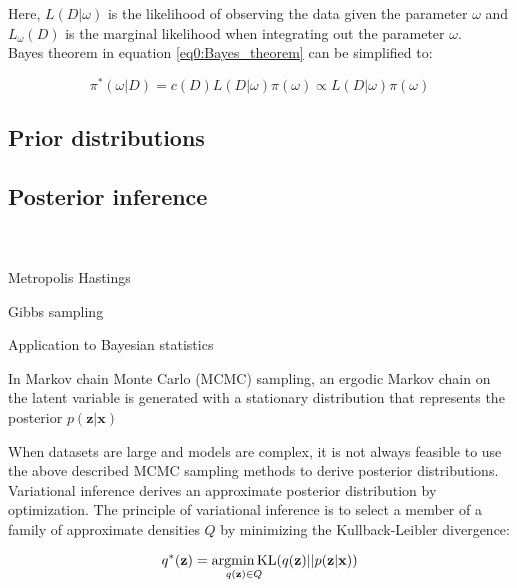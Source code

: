 Here, $L(D|\omega)$ is the likelihood of observing the data given the parameter $\omega$ and $L_\omega(D)$ is the marginal likelihood when integrating out the parameter $\omega$.\\

Bayes theorem in equation \ref{eq0:Bayes_theorem} can be simplified to:

\begin{equation}
\pi^*(\omega|D)=c(D)L(D|\omega)\pi(\omega)\propto{}L(D|\omega)\pi(\omega)
\end{equation} 



\subsection{Prior distributions}

\subsection{Posterior inference}

\\

\\

Metropolis Hastings \citep{Metropolis1953, Hastings1970}

Gibbs sampling \citep{Geman1984}

Application to Bayesian statistics \citep{Gelfand1990}

In Markov chain Monte Carlo (MCMC) sampling, an ergodic Markov chain on the latent variable is generated with a stationary distribution that represents the posterior $p(\mathbf{z}|\mathbf{x})$  


When datasets are large and models are complex, it is not always feasible to use the above described MCMC sampling methods to derive posterior distributions. Variational inference derives an approximate posterior distribution by optimization. The principle of variational inference is to select a member of a family of approximate densities $Q$ by minimizing the Kullback-Leibler divergence:

\begin{equation}
q^\ast(\mathbf{z})=\underset{q(\mathbf{z})\in{}Q}{\textnormal{argmin\,{}KL}}(q(\mathbf{z})||p(\mathbf{z}|\mathbf{x}))
\end{equation}

